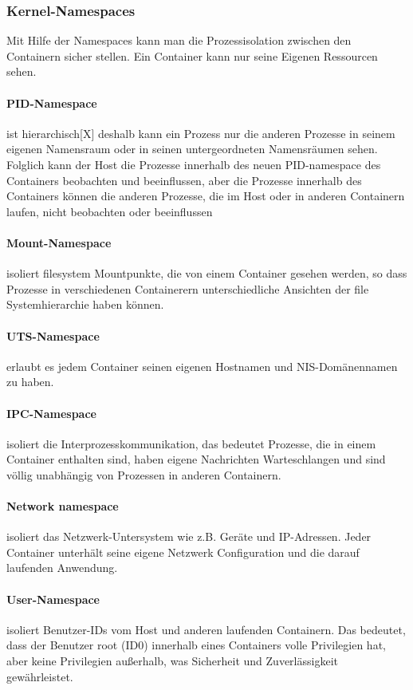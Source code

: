 \documentclass[12pt,a4paper,bibliography=totocnumbered,listof=totocnumbered]{scrartcl}
\begin{document}
\subsubsection{Kernel-Namespaces}
Mit Hilfe der Namespaces kann man die Prozessisolation zwischen den Containern sicher stellen. Ein Container kann nur seine Eigenen Ressourcen sehen.

\paragraph{PID-Namespace} ist hierarchisch[X] deshalb kann ein Prozess nur die anderen Prozesse in seinem eigenen Namensraum oder in seinen untergeordneten Namensräumen sehen. Folglich kann der Host die Prozesse innerhalb des neuen PID-namespace des Containers beobachten und beeinflussen, aber die Prozesse innerhalb des Containers können die anderen Prozesse, die im Host oder in anderen Containern laufen, nicht beobachten oder beeinflussen

\paragraph{Mount-Namespace} isoliert filesystem Mountpunkte, die von einem Container gesehen werden, so dass Prozesse in verschiedenen Containerern unterschiedliche Ansichten der file Systemhierarchie haben können.

\paragraph{UTS-Namespace} erlaubt es jedem Container seinen eigenen Hostnamen und NIS-Domänennamen zu haben.

\paragraph{IPC-Namespace} isoliert die Interprozesskommunikation, das bedeutet Prozesse, die in einem Container enthalten sind, haben eigene Nachrichten Warteschlangen und sind völlig unabhängig von Prozessen in anderen Containern.

\paragraph{Network namespace} isoliert das Netzwerk-Untersystem wie z.B. Geräte und IP-Adressen. Jeder Container unterhält seine eigene Netzwerk Configuration und die darauf laufenden Anwendung.

\paragraph{User-Namespace} isoliert Benutzer-IDs vom Host und anderen laufenden Containern. Das bedeutet, dass der Benutzer root (ID0) innerhalb eines Containers volle Privilegien hat, aber keine Privilegien außerhalb, was Sicherheit und Zuverlässigkeit gewährleistet. \cite{Xavier2015AClouds}
	
\end{document}
